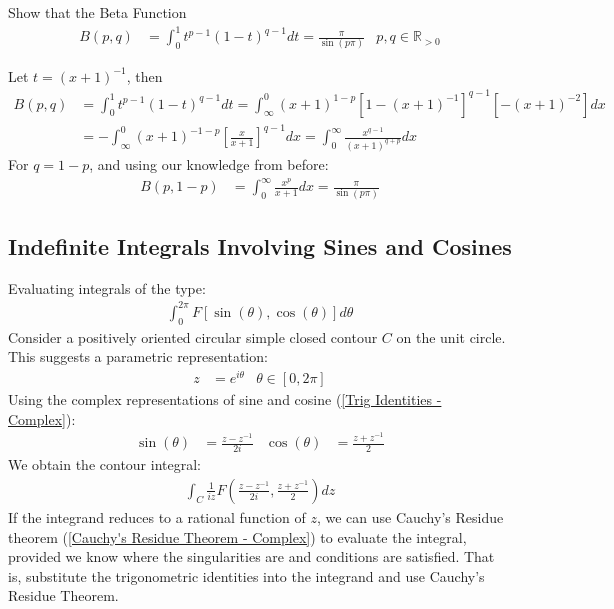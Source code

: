 \documentclass[12pt, english]{book}
\makeatletter
\renewenvironment{proof}[1][\proofname]{\par
	\pushQED{\qed}%
	\normalfont \topsep6\p@\@plus6\p@\relax
	\list{}{%
		\settowidth{\leftmargin}{\itshape\proofname:\hskip\labelsep}%
		\setlength{\labelwidth}{0pt}%
		\setlength{\itemindent}{-\leftmargin}%
	}%
	\item[\hskip\labelsep\itshape#1\@addpunct{:}]\ignorespaces
	}{ \popQED\endlist\@endpefalse}
\makeatother
\begin{document}
	\begin{example}
		\label{Beta Function Example - Complex}
		Show that the Beta Function
		\begin{align*}
			B(p,q) &= \int_{0}^{1} t^{p-1} (1-t)^{q-1} dt = \frac{\pi}{\sin(p\pi)}
				& p,q \in \mathbb{R}_{>0}
		\end{align*}
		\begin{proof}
			{\color{Grey}
			Let \(t = (x+1)^{-1}\), then
			\begin{align*}
				B(p, q) 
				&= \int_{0}^{1} t^{p-1} (1-t)^{q-1} dt 
				 = \int_{\infty}^{0} (x+1)^{1-p} [1- (x+1)^{-1}]^{q-1} [-(x+1)^{-2}] dx  \\
				&= - \int_{\infty}^{0} (x+1)^{-1-p} \left[\frac{x}{x+1}\right]^{q-1} dx
				 = \int_{0}^{\infty} \frac{x^{q-1}}{(x+1)^{q+p}} dx
			\end{align*}
			For \(q = 1-p\), and using our knowledge from before:
			\begin{align*}
				B(p, 1-p) &= \int_{0}^{\infty} \frac{x^{p}}{x+1} dx = \frac{\pi}{\sin(p\pi)}
			\end{align*}
			}
		\end{proof}
	\end{example}
	
	\subsection{Indefinite Integrals Involving Sines and Cosines} \label{Indefinite Integrals Involving Sines and Cosines Subsection - Complex}
	
	Evaluating integrals of the type:
	\begin{align*}
		\int_{0}^{2\pi} F[\sin(\theta), \cos(\theta)] d\theta
	\end{align*}
	Consider a positively oriented circular simple closed contour \(C\) on the unit circle. This suggests a parametric representation:
	\begin{align*}
		z &= e^{i\theta}	& \theta \in [0, 2\pi]
	\end{align*}
	Using the complex representations of sine and cosine (\cref{Trig Identities - Complex}):
	\begin{align*}
		\sin(\theta) &= \frac{z - z^{-1}}{2i} &
		\cos(\theta) &= \frac{z + z^{-1}}{2}
	\end{align*}
	We obtain the contour integral:
	\begin{align*}
		\int_{C} \frac{1}{iz} F\left( \frac{z-z^{-1}}{2i}, \frac{z+z^{-1}}{2}\right) dz
	\end{align*}
	If the integrand reduces to a rational function of \(z\), we can use Cauchy's Residue theorem (\cref{Cauchy's Residue Theorem - Complex}) to evaluate the integral, provided we know where the singularities are and conditions are satisfied. That is, substitute the trigonometric identities into the integrand and use Cauchy's Residue Theorem.
	
\end{document}
